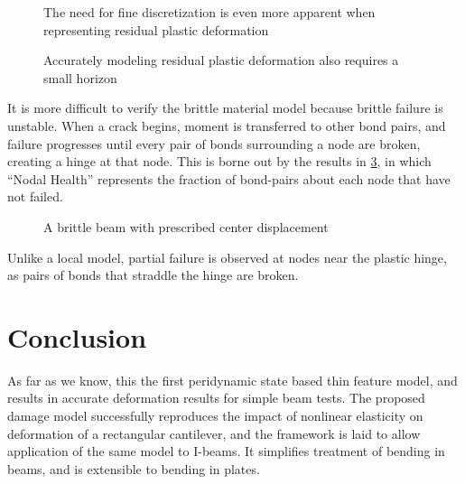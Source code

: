 \documentclass[5p,twocolumn]{elsarticle}
\newcommand{\plotpath}{./plots}
\begin{document}
%
\begin{figure}[h]
  \centering
  \resizebox{\linewidth}{!}{}
  \caption{The need for fine discretization is even more apparent when representing residual plastic deformation}
  \label{fig:ResidualPlasticityN}
\end{figure}
%
\begin{figure}[h]
  \centering
  \resizebox{\linewidth}{!}{}
  \caption{Accurately modeling residual plastic deformation also requires a small horizon}
  \label{fig:ResidualPlasticityH}
\end{figure}

It is more difficult to verify the brittle material model because brittle failure is unstable.
When a crack begins, moment is transferred to other bond pairs, and failure progresses until every pair of bonds surrounding a node are broken, creating a hinge at that node.
This is borne out by the results in \cref{fig:brittleBeam}, in which ``Nodal Health'' represents the fraction of bond-pairs about each node that have not failed.

\begin{figure}[h]
  \centering
  \resizebox{\linewidth}{!}{}
  \caption{A brittle beam with prescribed center displacement}
  \label{fig:brittleBeam}
\end{figure}

Unlike a local model, partial failure is observed at nodes near the plastic hinge, as pairs of bonds that straddle the hinge are broken.

\section{Conclusion}
\label{sec:Conclusion}

As far as we know, this the first peridynamic state based thin feature model, and results in accurate deformation results for simple beam tests.
The proposed damage model successfully reproduces the impact of nonlinear elasticity on deformation of a rectangular cantilever, and the framework is laid to allow application of the same model to I-beams.
It simplifies treatment of bending in beams, and is extensible to bending in plates.




\end{document}
